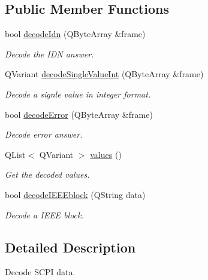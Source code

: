 \subsection*{Public Member Functions}
\begin{DoxyCompactItemize}
\item 
bool \hyperlink{classmdt_frame_codec_scpi_ada41abe80ecd27b4cc4f18bb96560753}{decodeIdn} (QByteArray \&frame)
\begin{DoxyCompactList}\small\item\em Decode the IDN answer. \end{DoxyCompactList}\item 
QVariant \hyperlink{classmdt_frame_codec_scpi_a7a2b463fbbd0c8d1d4d9d5c16a49d7bb}{decodeSingleValueInt} (QByteArray \&frame)
\begin{DoxyCompactList}\small\item\em Decode a signle value in integer format. \end{DoxyCompactList}\item 
bool \hyperlink{classmdt_frame_codec_scpi_aa2a184572eae360a274c89f7b8ba33e9}{decodeError} (QByteArray \&frame)
\begin{DoxyCompactList}\small\item\em Decode error answer. \end{DoxyCompactList}\item 
\hypertarget{classmdt_frame_codec_scpi_a86fc76aea879f706f511792b4add5efe}{
QList$<$ QVariant $>$ \hyperlink{classmdt_frame_codec_scpi_a86fc76aea879f706f511792b4add5efe}{values} ()}
\label{classmdt_frame_codec_scpi_a86fc76aea879f706f511792b4add5efe}

\begin{DoxyCompactList}\small\item\em Get the decoded values. \end{DoxyCompactList}\item 
bool \hyperlink{classmdt_frame_codec_scpi_a327afabbb6da25e31523ef4baa28cc87}{decodeIEEEblock} (QString data)
\begin{DoxyCompactList}\small\item\em Decode a IEEE block. \end{DoxyCompactList}\end{DoxyCompactItemize}


\subsection{Detailed Description}
Decode SCPI data. 

